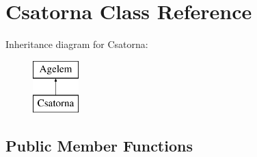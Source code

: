 \hypertarget{class_csatorna}{}\section{Csatorna Class Reference}
\label{class_csatorna}
Inheritance diagram for Csatorna\+:\begin{figure}[H]
\begin{center}
\leavevmode
\includegraphics[height=2.000000cm]{class_csatorna}
\end{center}
\end{figure}
\subsection*{Public Member Functions}
